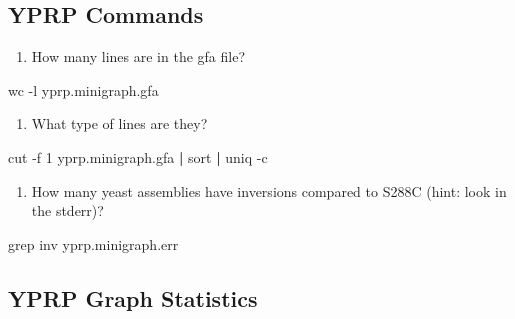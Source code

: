 \documentclass[
]{book}
\newenvironment{Shaded}{\begin{snugshade}}{\end{snugshade}}
\newcommand{\AttributeTok}[1]{\textcolor[rgb]{0.77,0.63,0.00}{#1}}
\newcommand{\FunctionTok}[1]{\textcolor[rgb]{0.00,0.00,0.00}{#1}}
\newcommand{\KeywordTok}[1]{\textcolor[rgb]{0.13,0.29,0.53}{\textbf{#1}}}
\newcommand{\NormalTok}[1]{#1}
\providecommand{\tightlist}{%
  \setlength{\itemsep}{0pt}\setlength{\parskip}{0pt}}
\begin{document}
\hypertarget{yprp-commands}{%
\subsection*{YPRP Commands}\label{yprp-commands}}

\begin{enumerate}
\def\labelenumi{\arabic{enumi}.}
\tightlist
\item
  How many lines are in the gfa file?
\end{enumerate}

\begin{Shaded}
\begin{Highlighting}[]
\FunctionTok{wc} \AttributeTok{{-}l}\NormalTok{ yprp.minigraph.gfa}
\end{Highlighting}
\end{Shaded}

\begin{enumerate}
\def\labelenumi{\arabic{enumi}.}
\setcounter{enumi}{1}
\tightlist
\item
  What type of lines are they?
\end{enumerate}

\begin{Shaded}
\begin{Highlighting}[]
\FunctionTok{cut} \AttributeTok{{-}f}\NormalTok{ 1 yprp.minigraph.gfa }\KeywordTok{|} \FunctionTok{sort} \KeywordTok{|} \FunctionTok{uniq} \AttributeTok{{-}c}
\end{Highlighting}
\end{Shaded}

\begin{enumerate}
\def\labelenumi{\arabic{enumi}.}
\setcounter{enumi}{2}
\tightlist
\item
  How many yeast assemblies have inversions compared to S288C (hint: look in the stderr)?
\end{enumerate}

\begin{Shaded}
\begin{Highlighting}[]
\FunctionTok{grep}\NormalTok{ inv yprp.minigraph.err}
\end{Highlighting}
\end{Shaded}

\hypertarget{yprp-graph-statistics}{%
\subsection*{YPRP Graph Statistics}\label{yprp-graph-statistics}}
\end{document}
